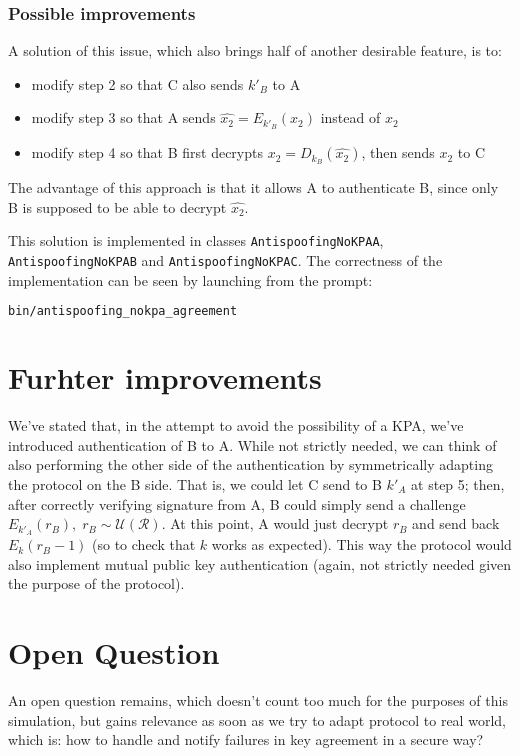 \documentclass[a4paper,12pt,titlepage]{article}
\begin{document}
\subsubsection*{Possible improvements}
A solution of this issue, which also brings half of another desirable feature,
is to:
\begin{itemize}
  \item modify step 2 so that C also sends $k'_B$ to A
  \item modify step 3 so that A sends $\hat{x_2} = E_{k'_B}(x_2)$ instead of $x_2$
  \item modify step 4 so that B first decrypts $x_2 = D_{k_B}(\hat{x_2})$, then
  sends $x_2$ to C
\end{itemize}
The advantage of this approach is that it allows A to authenticate B, since
only B is supposed to be able to decrypt $\hat{x_2}$.

This solution is implemented in classes \texttt{AntispoofingNoKPAA},
\texttt{AntispoofingNoKPAB} and
\texttt{AntispoofingNoKPAC}. The correctness of the implementation can be seen by launching
from the prompt:

\begin{lstlisting}[language=bash]
bin/antispoofing_nokpa_agreement
\end{lstlisting}

\section{Furhter improvements}
We've stated that, in the attempt to avoid the possibility of a KPA, we've
introduced authentication of B to A. While not strictly needed, we can think of
also performing the other side of the authentication by symmetrically adapting
the protocol on the B side. That is, we could let C send to B $k'_A$ at step 5;
then, after correctly verifying signature from A, B could simply send a
challenge $E_{k'_A}(r_B),\; r_B \sim \mathcal{U}(\mathcal{R})$. At this point,
A would just decrypt $r_B$ and send back $E_k(r_B - 1)$ (so to check that $k$
works as expected). This way the protocol would also implement mutual public
key authentication (again, not strictly needed given the purpose of the
protocol).

\section{Open Question}
An open question remains, which doesn't count too much for the purposes of this
simulation, but gains relevance as soon as we try to adapt protocol to real
world, which is: how to handle and notify failures in key agreement in a secure
way?
\end{document}

